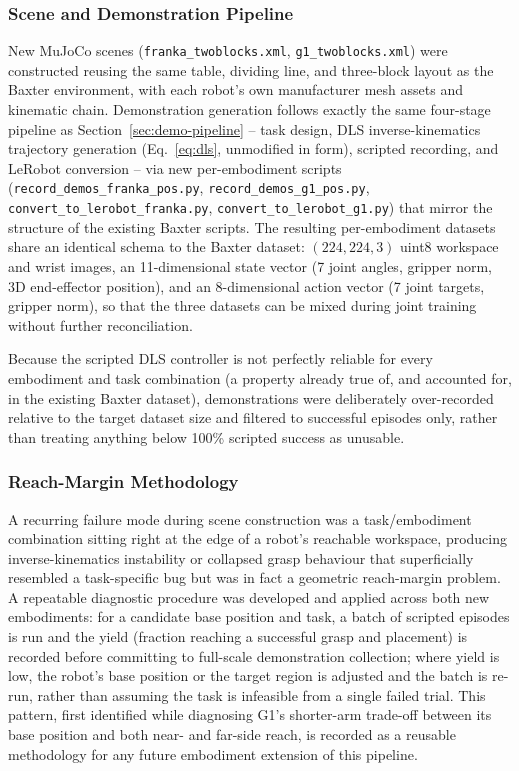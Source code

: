 \documentclass[12pt]{article}
\begin{document}
\subsubsection{Scene and Demonstration Pipeline}
New MuJoCo scenes (\texttt{franka\_twoblocks.xml}, \texttt{g1\_twoblocks.xml}) were constructed reusing the same table, dividing line, and three-block layout as the Baxter environment, with each robot's own manufacturer mesh assets and kinematic chain. Demonstration generation follows exactly the same four-stage pipeline as Section~\ref{sec:demo-pipeline} -- task design, DLS inverse-kinematics trajectory generation (Eq.~\ref{eq:dls}, unmodified in form), scripted recording, and LeRobot conversion -- via new per-embodiment scripts (\texttt{record\_demos\_franka\_pos.py}, \texttt{record\_demos\_g1\_pos.py}, \texttt{convert\_to\_lerobot\_franka.py}, \texttt{convert\_to\_lerobot\_g1.py}) that mirror the structure of the existing Baxter scripts. The resulting per-embodiment datasets share an identical schema to the Baxter dataset: $(224,224,3)$ uint8 workspace and wrist images, an 11-dimensional state vector (7 joint angles, gripper norm, 3D end-effector position), and an 8-dimensional action vector (7 joint targets, gripper norm), so that the three datasets can be mixed during joint training without further reconciliation.

Because the scripted DLS controller is not perfectly reliable for every embodiment and task combination (a property already true of, and accounted for, in the existing Baxter dataset), demonstrations were deliberately over-recorded relative to the target dataset size and filtered to successful episodes only, rather than treating anything below 100\% scripted success as unusable.

\subsubsection{Reach-Margin Methodology}
A recurring failure mode during scene construction was a task/embodiment combination sitting right at the edge of a robot's reachable workspace, producing inverse-kinematics instability or collapsed grasp behaviour that superficially resembled a task-specific bug but was in fact a geometric reach-margin problem. A repeatable diagnostic procedure was developed and applied across both new embodiments: for a candidate base position and task, a batch of scripted episodes is run and the yield (fraction reaching a successful grasp and placement) is recorded before committing to full-scale demonstration collection; where yield is low, the robot's base position or the target region is adjusted and the batch is re-run, rather than assuming the task is infeasible from a single failed trial. This pattern, first identified while diagnosing G1's shorter-arm trade-off between its base position and both near- and far-side reach, is recorded as a reusable methodology for any future embodiment extension of this pipeline.
\end{document}
